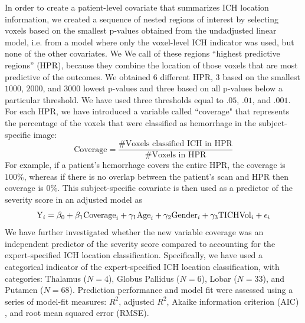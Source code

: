 \documentclass[10pt]{article}\usepackage[]{graphicx}\usepackage[]{color}
\begin{document}
In order to create a patient-level covariate that summarizes ICH location information, we created a sequence of nested regions of interest by selecting voxels based on the smallest p-values obtained from the undadjusted linear model, i.e. from a model where only the voxel-level ICH indicator was used, but none of the other covariates.  We We call of these regions ``highest predictive regions'' (HPR), because they combine the location of those voxels that are most predictive of the outcomes. 
We obtained 6 different HPR, $3$ based on the smallest $1000$, $2000$, and $3000$ lowest p-values and three based on all p-values below a particular threshold. We have used three thresholds equal to $.05$, $.01$, and $.001$. For each HPR, we have introduced a variable called ``coverage" that represents the percentage of the voxels that were classified as hemorrhage in the subject-specific image: 
\begin{equation}
\text{Coverage} = \frac{\text{\# Voxels classified ICH in HPR}}{\text{\# Voxels in HPR}}
\end{equation}
For example, if a patient's hemorrhage covers the entire HPR, the coverage is $100\%$, whereas if there is no overlap between the patient's scan and HPR then coverage is 0\%.  This subject-specific covariate is then used as a predictor of the severity score in an adjusted model as
$$
{\rm Y}_i = \beta_0 + \beta_1 {\rm Coverage}_i + \gamma_1{\rm Age}_i  +\gamma_2{\rm Gender}_i +\gamma_3{\rm TICHVol}_i + \epsilon_{i}
$$
We have further investigated whether the new variable coverage was an independent predictor of the severity score compared to accounting for the expert-specified ICH location classification. Specifically, we have used 
a categorical indicator of the expert-specified ICH location classification, with categories: Thalamus ($N = 4$), Globus Pallidus ($N = 6$), Lobar ($N = 33$), and Putamen ($N = 68$).  
Prediction performance and model fit were assessed using a series of model-fit measures: $R^2$, adjusted $R^2$, Akaike information criterion (AIC) \citep{akaike_information_1973}, 
and root mean squared error (RMSE).  
\end{document}
